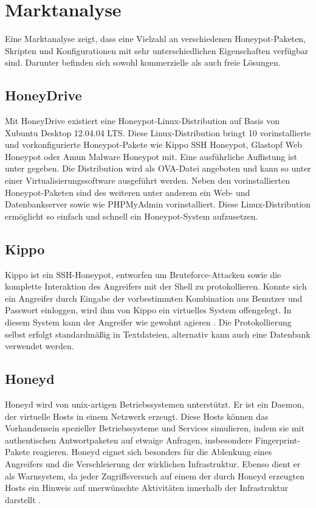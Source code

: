 \chapter{Marktanalyse}
\label{ch:Marktanalyse}

Eine Marktanalyse zeigt, dass eine Vielzahl an verschiedenen Honeypot-Paketen, Skripten und Konfigurationen mit sehr unterschiedlichen Eigenschaften verfügbar sind. Darunter befinden sich sowohl kommerzielle als auch freie Lösungen.

\section{HoneyDrive}
\label{sec:HoneyDrive}
Mit HoneyDrive existiert eine Honeypot-Linux-Distribution auf Basis von Xubuntu Desktop 12.04.04 LTS. Diese Linux-Distribution bringt 10 vorinstallierte und vorkonfigurierte Honeypot-Pakete wie Kippo SSH Honeypot, Glastopf Web Honeypot oder Amun Malware Honeypot mit. Eine ausführliche Auflistung ist unter \cite{honeydrive16} gegeben. Die Distribution wird als OVA-Datei angeboten und kann so unter einer Virtualisierungssoftware ausgeführt werden. Neben den vorinstallierten Honeypot-Paketen sind des weiteren unter anderem ein Web- und Datenbankserver sowie wie PHPMyAdmin vorinstalliert.
Diese Linux-Distribution ermöglicht so einfach und schnell ein Honeypot-System aufzusetzen.\\


\section{Kippo}
\label{sec:Kippo}
Kippo ist ein SSH-Honeypot, entworfen um Bruteforce-Attacken sowie die komplette Interaktion des Angreifers mit der Shell zu protokollieren. Konnte sich ein Angreifer durch Eingabe der vorbestimmten Kombination aus Benutzer und Passwort einloggen, wird ihm von Kippo ein virtuelles System offengelegt. In diesem System kann der Angreifer wie gewohnt agieren \cite{Kippo16}. Die Protokollierung selbst erfolgt standardmäßig in Textdateien, alternativ kann auch eine Datenbank verwendet werden.\\



\section{Honeyd}
\label{sec:Honeyd}
Honeyd wird von unix-artigen Betriebssystemen unterstützt. Er ist ein Daemon, der virtuelle Hosts in einem Netzwerk erzeugt. Diese Hosts können das Vorhandensein spezieller Betriebssysteme und Services simulieren, indem sie mit authentischen Antwortpaketen auf etwaige Anfragen, insbesondere Fingerprint-Pakete reagieren. Honeyd eignet sich besonders für die Ablenkung eines Angreifers und die Verschleierung der wirklichen Infrastruktur. Ebenso  dient er als Warnsystem, da jeder Zugriffsversuch auf einem der durch Honeyd erzeugten Hosts ein Hinweis auf unerwünschte Aktivitäten innerhalb der Infrastruktur darstellt \cite{Honeyd16}.\\



